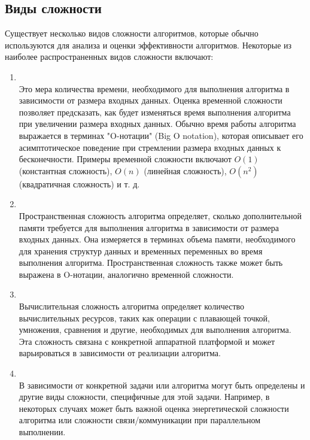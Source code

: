     \subsection{Виды сложности}
        Существует несколько видов сложности алгоритмов, которые обычно используются для анализа и оценки эффективности алгоритмов. Некоторые из наиболее распространенных видов сложности включают:
        \begin{enumerate}
            \item {}\\
                Это мера количества времени, необходимого для выполнения алгоритма в зависимости от размера входных данных. Оценка временной сложности позволяет предсказать, как будет изменяться время выполнения алгоритма при увеличении размера входных данных. Обычно время работы алгоритма выражается в терминах "O-нотации" (Big O notation), которая описывает его асимптотическое поведение при стремлении размера входных данных к бесконечности. Примеры временной сложности включают $O(1)$ (константная сложность), $O(n)$ (линейная сложность), $O(n^2)$ (квадратичная сложность) и т. д.

            \item {}\\
                Пространственная сложность алгоритма определяет, сколько дополнительной памяти требуется для выполнения алгоритма в зависимости от размера входных данных. Она измеряется в терминах объема памяти, необходимого для хранения структур данных и временных переменных во время выполнения алгоритма. Пространственная сложность также может быть выражена в O-нотации, аналогично временной сложности.
            \item {}\\
                Вычислительная сложность алгоритма определяет количество вычислительных ресурсов, таких как операции с плавающей точкой, умножения, сравнения и другие, необходимых для выполнения алгоритма. Эта сложность связана с конкретной аппаратной платформой и может варьироваться в зависимости от реализации алгоритма.
            \item {}\\
                В зависимости от конкретной задачи или алгоритма могут быть определены и другие виды сложности, специфичные для этой задачи. Например, в некоторых случаях может быть важной оценка энергетической сложности алгоритма или сложности связи/коммуникации при параллельном выполнении.
        \end{enumerate}
